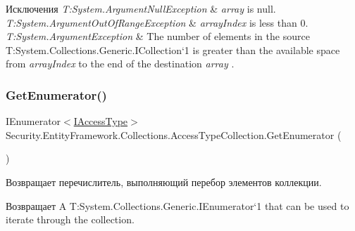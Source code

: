 \begin{DoxyExceptions}{Исключения}
{\em T\+:\+System.\+Argument\+Null\+Exception} & {\itshape array}  is null.\\
\hline
{\em T\+:\+System.\+Argument\+Out\+Of\+Range\+Exception} & {\itshape array\+Index}  is less than 0.\\
\hline
{\em T\+:\+System.\+Argument\+Exception} & The number of elements in the source T\+:\+System.\+Collections.\+Generic.\+I\+Collection`1 is greater than the available space from {\itshape array\+Index}  to the end of the destination {\itshape array} .\\
\hline
\end{DoxyExceptions}
\mbox{\label{class_security_1_1_entity_framework_1_1_collections_1_1_access_type_collection_adb954d417bd124bddc20d4ec9f89213d}} 
\subsubsection{\texorpdfstring{Get\+Enumerator()}{GetEnumerator()}}
{\footnotesize\ttfamily I\+Enumerator$<$\hyperlink{interface_security_1_1_interfaces_1_1_model_1_1_i_access_type}{I\+Access\+Type}$>$ Security.\+Entity\+Framework.\+Collections.\+Access\+Type\+Collection.\+Get\+Enumerator (\begin{DoxyParamCaption}{ }\end{DoxyParamCaption})}



Возвращает перечислитель, выполняющий перебор элементов коллекции. 

\begin{DoxyReturn}{Возвращает}
A T\+:\+System.\+Collections.\+Generic.\+I\+Enumerator`1 that can be used to iterate through the collection. 
\end{DoxyReturn}
\mbox{\label{class_security_1_1_entity_framework_1_1_collections_1_1_access_type_collection_a6c193d1581e2db71f87ce4d892419e60}} 
